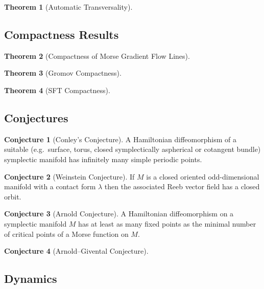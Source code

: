 \documentclass[a4paper]{article}
\theoremstyle{definition}
\newtheorem{thm}{Theorem}
\newtheorem{conjecture}{Conjecture}
\theoremstyle{definition}
\theoremstyle{remark}
\theoremstyle{remark}
\theoremstyle{remark}
\begin{document}
\begin{thm}[Automatic Transversality]
  
\end{thm}

\subsection{Compactness Results}

\begin{thm}[Compactness of Morse Gradient Flow Lines]
  
\end{thm}

\begin{thm}[Gromov Compactness]
  
\end{thm}

\begin{thm}[SFT Compactness]
  
\end{thm}

\subsection{Conjectures}

\begin{conjecture}[Conley's Conjecture]
  A Hamiltonian diffeomorphism of a suitable (e.g.\ surface, torus, closed symplectically aspherical or cotangent bundle) symplectic manifold has infinitely many simple periodic points.
\end{conjecture}

\begin{conjecture}[Weinstein Conjecture]
  If $M$ is a closed oriented odd-dimensional manifold with a contact form $\lambda$ then the associated Reeb vector field has a closed orbit.
\end{conjecture}

\begin{conjecture}[Arnold Conjecture]
  A Hamiltonian diffeomorphism on a symplectic manifold $M$ has at least as many fixed points as the minimal number of critical points of a Morse function on $M$.
\end{conjecture}

\begin{conjecture}[Arnold--Givental Conjecture]
  
\end{conjecture}

\subsection{Dynamics}
\end{document}
